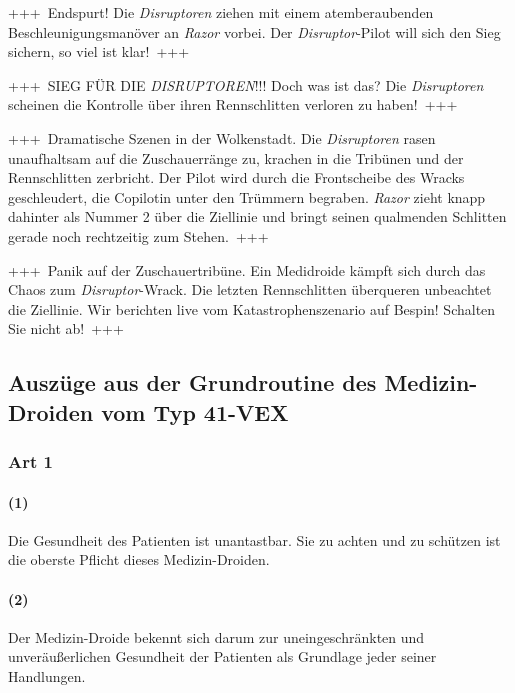 \documentclass[final]{multiversum}
\begin{document}
+++~Endspurt!
    Die \textit{Disruptoren} ziehen mit einem atemberaubenden Beschleunigungsmanöver an \textit{Razor} vorbei.
    Der \textit{Disruptor}-Pilot will sich den Sieg sichern, so viel ist klar!~+++

+++~SIEG FÜR DIE \textit{DISRUPTOREN}!!!
    Doch was ist das?
    Die \textit{Disruptoren} scheinen die Kontrolle über ihren Rennschlitten verloren zu haben!~+++

+++~Dramatische Szenen in der Wolkenstadt.
    Die \textit{Disruptoren} rasen unaufhaltsam auf die Zuschauerränge zu, krachen in die Tribünen und der Rennschlitten zerbricht.
    Der Pilot wird durch die Frontscheibe des Wracks geschleudert, die Copilotin unter den Trümmern begraben.
    \textit{Razor} zieht knapp dahinter als Nummer 2 über die Ziellinie und bringt seinen qualmenden Schlitten gerade noch rechtzeitig zum Stehen.~+++

+++~Panik auf der Zuschauertribüne.
    Ein Medidroide kämpft sich durch das Chaos zum \textit{Disruptor}-Wrack.
    Die letzten Rennschlitten überqueren unbeachtet die Ziellinie.
    Wir berichten live vom Katastrophenszenario auf Bespin! Schalten Sie nicht ab!~+++

\setlength{\parskip}{0pt}
\setbeforeparaskip{0pt}
\setparaheadstyle{}
\setsubsubsecheadstyle{\centering\bfseries}

\subsection{Auszüge aus der Grundroutine des Medizin-Droiden vom Typ 41-VEX}

\subsubsection{Art 1}
\paragraph{(1)} Die Gesundheit des Patienten ist unantastbar. Sie zu achten und zu schützen ist die oberste Pflicht dieses Medizin-Droiden.
\paragraph{(2)} Der Medizin-Droide bekennt sich darum zur uneingeschränkten und unveräußerlichen Gesundheit der Patienten als Grundlage jeder seiner Handlungen.
\end{document}
